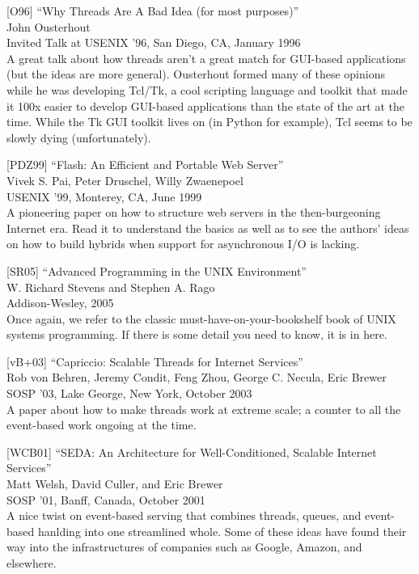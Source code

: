 {[}O96{]} ``Why Threads Are A Bad Idea (for most purposes)''\\
John Ousterhout\\
Invited Talk at USENIX '96, San Diego, CA, January 1996\\
A great talk about how threads aren't a great match for GUI-based
applications (but the ideas are more general). Ousterhout formed many of
these opinions while he was developing Tcl/Tk, a cool scripting language
and toolkit that made it 100x easier to develop GUI-based applications
than the state of the art at the time. While the Tk GUI toolkit lives on
(in Python for example), Tcl seems to be slowly dying (unfortunately).

{[}PDZ99{]} ``Flash: An Efficient and Portable Web Server''\\
Vivek S. Pai, Peter Druschel, Willy Zwaenepoel\\
USENIX '99, Monterey, CA, June 1999\\
A pioneering paper on how to structure web servers in the
then-burgeoning Internet era. Read it to understand the basics as well
as to see the authors' ideas on how to build hybrids when support for
asynchronous I/O is lacking.

{[}SR05{]} ``Advanced Programming in the UNIX Environment''\\
W. Richard Stevens and Stephen A. Rago\\
Addison-Wesley, 2005\\
Once again, we refer to the classic must-have-on-your-bookshelf book of
UNIX systems programming. If there is some detail you need to know, it
is in here.

{[}vB+03{]} ``Capriccio: Scalable Threads for Internet Services''\\
Rob von Behren, Jeremy Condit, Feng Zhou, George C. Necula, Eric
Brewer\\
SOSP '03, Lake George, New York, October 2003\\
A paper about how to make threads work at extreme scale; a counter to
all the event-based work ongoing at the time.

{[}WCB01{]} ``SEDA: An Architecture for Well-Conditioned, Scalable
Internet Services''\\
Matt Welsh, David Culler, and Eric Brewer\\
SOSP '01, Banff, Canada, October 2001\\
A nice twist on event-based serving that combines threads, queues, and
event-based hanlding into one streamlined whole. Some of these ideas
have found their way into the infrastructures of companies such as
Google, Amazon, and elsewhere.

